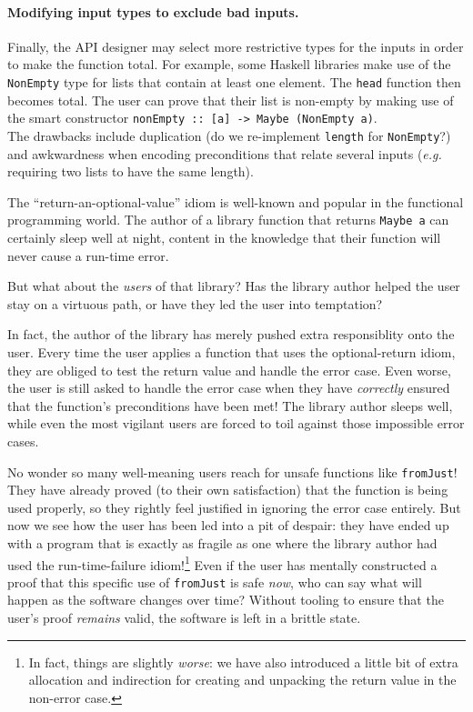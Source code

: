 \documentclass[format=sigplan, review=false, screen=true]{acmart}
\makeatletter
\let\origsubsection\subsection
\renewcommand\subsection{\@ifstar{\starsubsection}{\nostarsubsection}}
\newcommand\nostarsubsection[1]
{\subsectionprelude\origsubsection{#1}\subsectionpostlude}
\newcommand\starsubsection[1]
{\subsectionprelude\origsubsection*{#1}\subsectionpostlude}
\newcommand\subsectionprelude{%
  \vspace{-0.25em}
}
\newcommand\subsectionpostlude{%
  \vspace{-0.05em}
}
\makeatother
\begin{document}
\paragraph{Modifying input types to exclude bad inputs.}
Finally, the API designer may select more restrictive types for the inputs in order
to make the function total. For example, some Haskell libraries make use of the
\texttt{NonEmpty} type for lists that contain at least one element. The \texttt{head}
function then becomes total. The user 
can prove that their list is non-empty by making use of the smart constructor
\texttt{nonEmpty :: [a] -> Maybe (NonEmpty a)}.\\
The drawbacks include duplication
(do we re-implement \texttt{length} for \texttt{NonEmpty}?)
and awkwardness when encoding preconditions that relate
several inputs (\textit{e.g.} requiring two lists to have the same length).

\subsection{Leading the user into temptation}
The ``return-an-optional-value'' idiom is well-known and popular in the functional
programming world. The author of a library function that returns \texttt{Maybe a}
can certainly sleep well at night, content in the knowledge that their function
will never cause a run-time error.

But what about the \emph{users} of that library? Has the library author helped the user stay
on a virtuous path, or have they led the user into temptation?

In fact, the author of the library has merely pushed extra responsiblity onto the user.
Every time the user applies a function that uses the optional-return idiom, they are obliged
to test the return value and handle the error case. Even worse, the user is still asked
to handle the error case when they have \emph{correctly} ensured that the function's
preconditions have been met! The library author sleeps well, while even the most vigilant
users are forced to toil against those impossible error cases.

No wonder so many well-meaning users reach for unsafe functions like \texttt{fromJust}!
They have already proved (to their own satisfaction) that the function is being used properly, so they rightly
feel justified in ignoring the error case entirely. But now we see how the user has been led into
a pit of despair: they have ended up with a program that is exactly as fragile as one where the library
author had used the run-time-failure idiom!\footnote{In fact, things are slightly \emph{worse}: we have also introduced a little
bit of extra allocation and indirection for creating and unpacking the return value in the non-error case.}
Even if the user has mentally constructed a proof that this specific use of \texttt{fromJust} is safe \emph{now},
who can say what will
happen as the software changes over time? Without tooling to ensure that the user's proof \emph{remains} valid,
the software is left in a brittle state.
\end{document}
